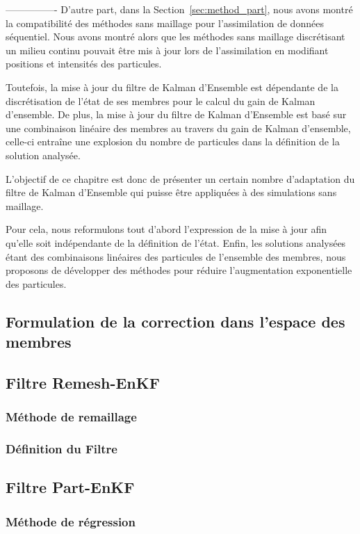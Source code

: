 ----------------
D'autre part, dans la Section~\ref{sec:method_part}, nous avons montré la compatibilité des méthodes sans maillage pour l'assimilation de données séquentiel. Nous avons montré alors que les méthodes sans maillage discrétisant un milieu continu pouvait être mis à jour lors de l'assimilation en modifiant positions et intensités des particules.

Toutefois, la mise à jour du filtre de Kalman d'Ensemble est dépendante de la discrétisation de l'état de ses membres pour le calcul du gain de Kalman d'ensemble. De plus, la mise à jour du filtre de Kalman d'Ensemble est basé sur une combinaison linéaire des membres au travers du gain de Kalman d'ensemble, celle-ci entraîne une explosion du nombre de particules dans la définition de la solution analysée.

L'objectif de ce chapitre est donc de présenter un certain nombre d'adaptation du filtre de Kalman d'Ensemble qui puisse être appliquées à des simulations sans maillage.

Pour cela, nous reformulons tout d'abord l'expression de la mise à jour afin qu'elle soit indépendante de la définition de l'état.
Enfin, les solutions analysées étant des combinaisons linéaires des particules de l'ensemble des membres, nous proposons de développer des méthodes pour réduire l'augmentation exponentielle des particules.

\subsection{Formulation de la correction dans l'espace des membres}

\subsection{Filtre Remesh-EnKF}
\subsubsection{Méthode de remaillage}
\subsubsection{Définition du Filtre}
\subsection{Filtre Part-EnKF}
\subsubsection{Méthode de régression}
